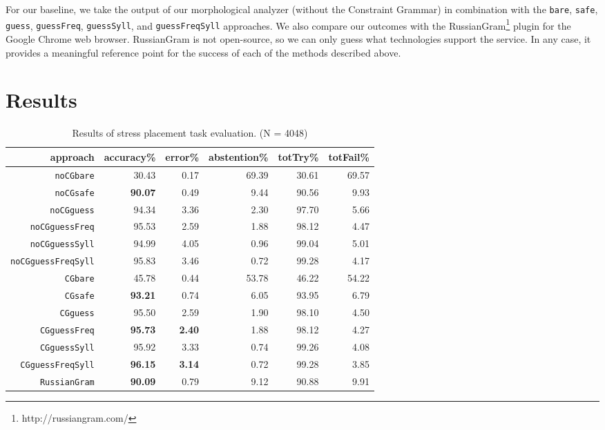 \documentclass[11pt]{article}
\begin{document}
For our baseline, we take the output of our morphological analyzer (without the 
Constraint Grammar) in combination with the {\small {\tt bare}}, 
{\small {\tt safe}}, {\small {\tt guess}}, {\small {\tt guessFreq}}, 
{\small {\tt guessSyll}}, and {\small {\tt guessFreqSyll}} approaches. We also 
compare our outcomes with the RussianGram\footnote{http://russiangram.com/} 
plugin for the Google Chrome web browser. RussianGram is not open-source, so we
can only guess what technologies support the service. In any case, it provides a
meaningful reference point for the success of each of the methods described 
above.

\section{Results}

\begin{table*}[t]
  \centering
  \begin{tabular}{r | r r r | r r }
    approach & accuracy\% & error\% & abstention\% & totTry\% & totFail\% \\
    \hline
    \hline
    {\small {\tt noCGbare}} & 30.43 & 0.17 & 69.39 & 30.61 & 69.57 \\
    {\small {\tt noCGsafe}} & \bf{90.07} & 0.49 & 9.44 & 90.56 & 9.93 \\
    {\small {\tt noCGguess}} & 94.34 & 3.36 & 2.30 & 97.70 & 5.66 \\
    {\small {\tt noCGguessFreq}} & 95.53 & 2.59 & 1.88 & 98.12 & 4.47 \\
    {\small {\tt noCGguessSyll}} & 94.99 & 4.05 & 0.96 & 99.04 & 5.01 \\
    {\small {\tt noCGguessFreqSyll}} & 95.83 & 3.46 & 0.72 & 99.28 & 4.17 \\
    \hline
    {\small {\tt CGbare}} & 45.78 & 0.44 & 53.78 & 46.22 & 54.22 \\
    {\small {\tt CGsafe}} & \bf{93.21} & 0.74 & 6.05 & 93.95 & 6.79 \\
    {\small {\tt CGguess}} & 95.50 & 2.59 & 1.90 & 98.10 & 4.50 \\
    {\small {\tt CGguessFreq}} & \bf{95.73} & \bf{2.40} & 1.88 & 98.12 & 4.27 \\
    {\small {\tt CGguessSyll}} & 95.92 & 3.33 & 0.74 & 99.26 & 4.08 \\
    {\small {\tt CGguessFreqSyll}} & \bf{96.15} & \bf{3.14} & 0.72 & 99.28 & 3.85 \\
    \hline
    {\small {\tt RussianGram}} & \bf{90.09} & 0.79 & 9.12 & 90.88 & 9.91
  \end{tabular}
  \caption{Results of stress placement task evaluation. (N = 4048)}
  \label{tab:results}
\end{table*}
\end{document}

